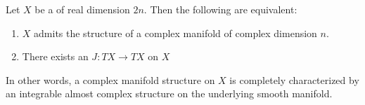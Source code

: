 
\begin{theorem} \label{theorem:complex_manifold_is_equivalent_to_a_smooth_manifold_of_even_real_dimension_with_an_integrable_almost_complex_structure}
Let $X$ be a of real dimension $2n$. Then the following are equivalent:
\begin{enumerate}
    \item[(1)] $X$ admits the structure of a complex manifold of complex dimension $n$.
    \item[(2)] There exists an   $J : TX \to TX$ on $X$ 
\end{enumerate}
In other words, a complex manifold structure on $X$ is completely characterized by an integrable almost complex structure on the underlying smooth manifold.
\end{theorem}
